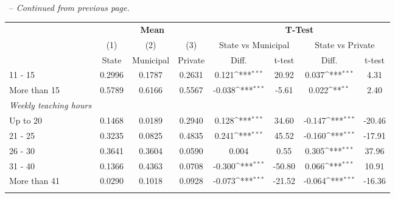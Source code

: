 \documentclass[a4paper, 12pt]{article}
\newcommand{\sym}[1]{\rlap{#1}}%
\begin{document}
\vspace{10pt}
\tablename\ \addtocounter{table}{-1} \thetable\ -- \textit{Continued from previous page.}
\vspace{-10pt}
\begin{longtable}{@{\extracolsep{1pt}}l*{7}{c}@{}} 
\def\sym#1{\ifmmode^{#1}\else\(^{#1}\)\fi}
\begin{adjustbox}{scale=0.9}
\begin{tabular}{l*{1}{ccccccc}}
\toprule
            &\multicolumn{3}{c}{\textbf{Mean}}                                                                                    &\multicolumn{4}{c}{\textbf{T-Test}}                                                                                     \\ \cline{2-4} \cline{5-8}                                                                                     
            &\multicolumn{1}{c}{(1)}                                                                                     &\multicolumn{1}{c}{(2)} &\multicolumn{1}{c}{(3)}  &\multicolumn{2}{c}{State vs Municipal} &\multicolumn{2}{c}{State vs Private}\\  
            &       State&   Municipal&     Private&       Diff.         &      t-test&       Diff.         &      t-test\\
\midrule
11 - 15     &      0.2996&      0.1787&      0.2631&       0.121\sym{***}&       20.92&       0.037\sym{***}&        4.31\\
More than 15&      0.5789&      0.6166&      0.5567&       -0.038\sym{***}&       -5.61&       0.022\sym{**} &        2.40\\
\emph{Weekly teaching hours}&            &            &            &                     &            &                     &            \\
Up to 20    &      0.1468&      0.0189&      0.2940&      0.128\sym{***}&       34.60&      -0.147\sym{***}&      -20.46\\
21 - 25     &      0.3235&      0.0825&      0.4835&      0.241\sym{***}&       45.52&      -0.160\sym{***}&      -17.91\\
26 - 30     &      0.3641&      0.3604&      0.0590&       0.004         &        0.55&       0.305\sym{***}&       37.96\\
31 - 40     &      0.1366&      0.4363&      0.0708&       -0.300\sym{***}&      -50.80&       0.066\sym{***}&       10.91\\
More than 41&      0.0290&      0.1018&      0.0928&      -0.073\sym{***}&      -21.52&      -0.064\sym{***}&      -16.36\\

\end{tabular}
\end{adjustbox}
\end{longtable}
\end{document}
